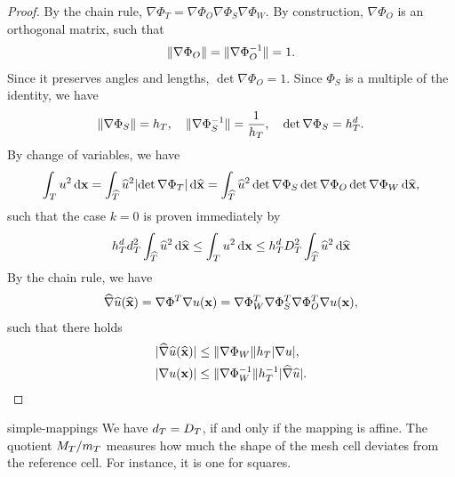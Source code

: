 \begin{proof}
  By the chain rule,
  $\nabla \Phi_T = \nabla \Phi_O \nabla \Phi_S \nabla \Phi_W$. By
  construction, $\nabla\Phi_O$ is an orthogonal matrix, such that
  \begin{gather*}
    \lVert\nabla\Phi_O\rVert = \lVert\nabla\Phi_O^{-1}\rVert = 1.
  \end{gather*}
  Since it preserves angles and lengths, $\det \nabla\Phi_O =
  1$. Since $\Phi_S$ is a multiple of the identity, we have
  \begin{gather*}
    \lVert\nabla\Phi_S\rVert = h_T,
    \quad\lVert\nabla\Phi_S^{-1}\rVert = \frac1{h_T},
    \quad\det\nabla\Phi_S = h_T^d.
  \end{gather*}
  By change of variables, we have
  \begin{gather*}
    \int_T u^2 \,\mathrm{d} \mathbf x
    = \int_{\widehat {T}} \widehat{u}^2 \lvert\det\nabla\Phi_T\rvert \,\mathrm{d} \widehat {\mathbf x}
    = \int_{\widehat {T}} \widehat{u}^2 \det\nabla\Phi_S\det\nabla\Phi_O\det\nabla\Phi_W \,\mathrm{d} \widehat {\mathbf x}
    ,
  \end{gather*}
  such that the case $k=0$ is proven immediately by
  \begin{gather*}
    h_T^d d_T^2 \int_{\widehat {T}} \widehat{u}^2 \,\mathrm{d} \widehat {\mathbf x}
    \le \int_T u^2 \,\mathrm{d} \mathbf x
    \le h_T^d D_T^2 \int_{\widehat {T}} \widehat{u}^2 \,\mathrm{d} \widehat {\mathbf x}
  \end{gather*}
  By the chain rule, we have
  \begin{gather*}
    \widehat{\nabla}\widehat{u}(\widehat{\mathbf x}) = \nabla\Phi^T \nabla u(\mathbf x)
    = \nabla\Phi_W^T \nabla\Phi_S^T \nabla\Phi_O^T \nabla u(\mathbf x),
  \end{gather*}
  such that there holds
  \begin{gather}
    \begin{split}
      \lvert\widehat{\nabla}\widehat{u}(\widehat{\mathbf x})\rvert
      &\le \lVert\nabla\Phi_W\rVert h_T \lvert\nabla u\rvert,\\
      \lvert\nabla u(\mathbf x)\rvert
      &\le \lVert\nabla\Phi_W^{-1}\rVert h_T^{-1} \lvert\widehat{\nabla} \widehat{u}\rvert.
    \end{split}
  \end{gather}
\end{proof}


\begin{Remark}{simple-mappings}
  We have $d_T = D_T$, if and only if the mapping is
  affine. The quotient $M_T/m_T$ measures how much the shape
  of the mesh cell deviates from the reference cell. For instance, it
  is one for squares.
\end{Remark}


